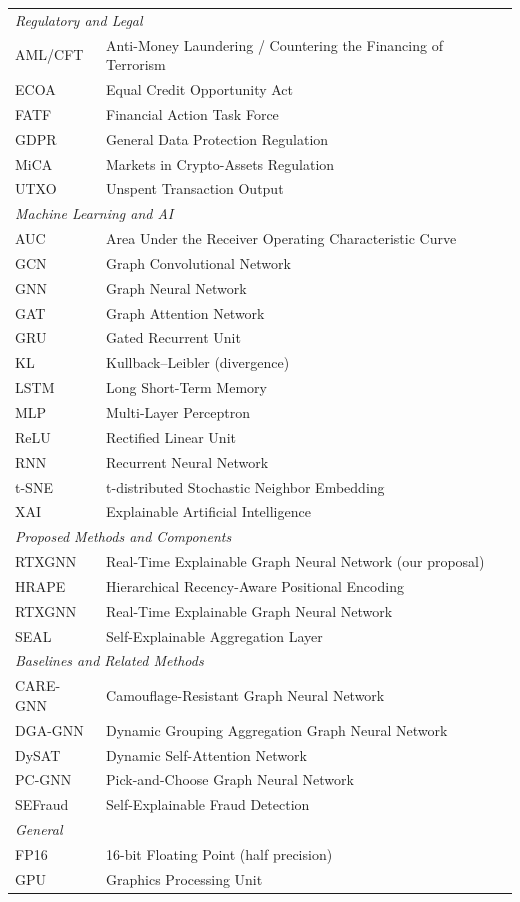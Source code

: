 \begin{center}
\begin{longtable}{ll}
\multicolumn{2}{l}{\textit{Regulatory and Legal}} \\
AML/CFT   & Anti-Money Laundering / Countering the Financing of Terrorism \\
ECOA      & Equal Credit Opportunity Act \\
FATF      & Financial Action Task Force \\
GDPR      & General Data Protection Regulation \\
MiCA      & Markets in Crypto-Assets Regulation \\
UTXO      & Unspent Transaction Output \\
\hline
\multicolumn{2}{l}{\textit{Machine Learning and AI}} \\
AUC       & Area Under the Receiver Operating Characteristic Curve \\
GCN       & Graph Convolutional Network \\
GNN       & Graph Neural Network \\
GAT       & Graph Attention Network \\
GRU       & Gated Recurrent Unit \\
KL        & Kullback--Leibler (divergence) \\
LSTM      & Long Short-Term Memory \\
MLP       & Multi-Layer Perceptron \\
ReLU      & Rectified Linear Unit \\
RNN       & Recurrent Neural Network \\
t-SNE     & t-distributed Stochastic Neighbor Embedding \\
XAI       & Explainable Artificial Intelligence \\
\hline
\multicolumn{2}{l}{\textit{Proposed Methods and Components}} \\
RTXGNN & Real-Time Explainable Graph Neural Network (our proposal)\\
HRAPE     & Hierarchical Recency-Aware Positional Encoding \\
RTXGNN   & Real-Time Explainable Graph Neural Network \\
SEAL      & Self-Explainable Aggregation Layer \\
\hline
\multicolumn{2}{l}{\textit{Baselines and Related Methods}} \\
CARE-GNN  & Camouflage-Resistant Graph Neural Network \\
DGA-GNN   & Dynamic Grouping Aggregation Graph Neural Network \\
DySAT     & Dynamic Self-Attention Network \\
PC-GNN    & Pick-and-Choose Graph Neural Network \\
SEFraud   & Self-Explainable Fraud Detection \\
\hline
\multicolumn{2}{l}{\textit{General}} \\
FP16      & 16-bit Floating Point (half precision) \\
GPU       & Graphics Processing Unit \\

\end{longtable}
\end{center}

